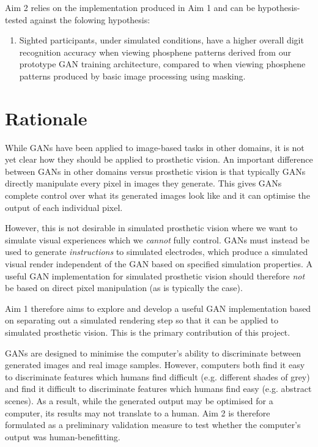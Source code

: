 \documentclass[11pt]{book}
\begin{document}
Aim 2 relies on the implementation produced in Aim 1 and can be hypothesis-tested against the folowing hypothesis:

\begin{enumerate}
\item Sighted participants, under simulated conditions, have a higher overall digit recognition accuracy when viewing phosphene patterns derived from our prototype GAN training architecture, compared to when viewing phosphene patterns produced by basic image processing using masking.
\end{enumerate}

\section*{Rationale}
\label{sec:org0e1c73b}

While GANs have been applied to image-based tasks in other domains, it is not yet clear how they should be applied to prosthetic vision.
An important difference between GANs in other domains versus prosthetic vision is that typically GANs directly manipulate every pixel in images they generate.
This gives GANs complete control over what its generated images look like and it can optimise the output of each individual pixel.

However, this is not desirable in simulated prosthetic vision where we want to simulate visual experiences which we \emph{cannot} fully control.
GANs must instead be used to generate \emph{instructions} to simulated electrodes, which produce a simulated visual render independent of the GAN based on specified simulation properties.
A useful GAN implementation for simulated prosthetic vision should therefore \emph{not} be based on direct pixel manipulation (as is typically the case).

Aim 1 therefore aims to explore and develop a useful GAN implementation based on separating out a simulated rendering step so that it can be applied to simulated prosthetic vision.
This is the primary contribution of this project.

GANs are designed to minimise the computer's ability to discriminate between generated images and real image samples.
However, computers both find it easy to discriminate features which humans find difficult (e.g. different shades of grey) and find it difficult to discriminate features which humans find easy (e.g. abstract scenes).
As a result, while the generated output may be optimised for a computer, its results may not translate to a human.
Aim 2 is therefore formulated as a preliminary validation measure to test whether the computer's output was human-benefitting.
\end{document}
